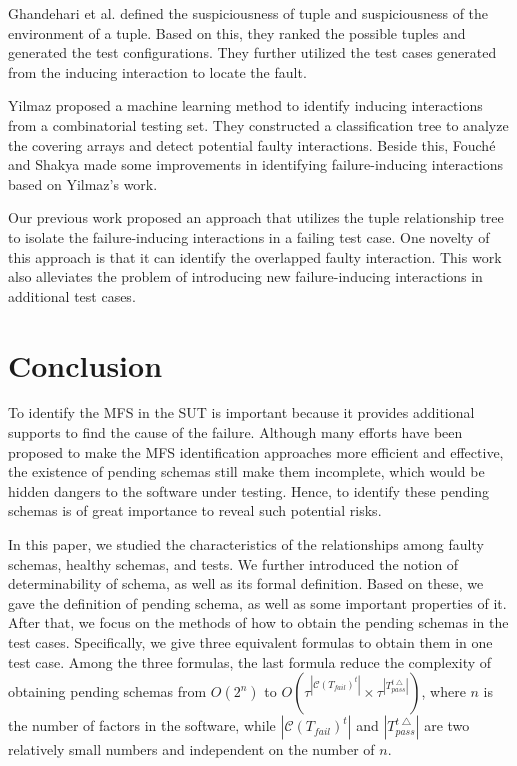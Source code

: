 {Ghandehari et al. \cite{ghandehari2012identifying} defined the suspiciousness of tuple and suspiciousness of the environment of a tuple. Based on this, they ranked the possible tuples and generated the test configurations. They \cite{ghandehari2013fault} further utilized the test cases generated from the inducing interaction to locate the fault.

Yilmaz \cite{yilmaz2006covering} proposed a machine learning method to identify inducing interactions from a combinatorial testing set. They constructed a classification tree to analyze the covering arrays and detect potential faulty interactions. Beside this, Fouch{\'e} \cite{fouche2009incremental} and Shakya \cite{shakya2012isolating} made some improvements in identifying failure-inducing interactions based on Yilmaz's work.

Our previous work \cite{niu2013identifying} proposed an approach that utilizes the tuple relationship tree to isolate the failure-inducing interactions in a failing test case. One novelty of this approach is that it can identify the overlapped faulty interaction. This work also alleviates the problem of introducing new failure-inducing interactions in additional test cases.



\section{Conclusion}\label{sec:conclusion}
To identify the MFS in the SUT is important because it provides additional supports to find the cause of the failure. Although many efforts have been proposed to make the MFS identification approaches more efficient and effective, the existence of pending schemas still make them incomplete, which would be hidden dangers to the software under testing. Hence, to identify these pending schemas is of great importance to reveal such potential risks.

In this paper, we studied the characteristics of the relationships among faulty schemas, healthy schemas, and tests. We further introduced the notion of determinability of schema, as well as its formal definition.
Based on these, we gave the definition of pending schema, as well as some important properties of it. After that, we focus on the methods of how to obtain the pending schemas in the test cases. Specifically, we give three equivalent formulas to obtain them in one test case. Among the three formulas, the last formula reduce the complexity of obtaining pending schemas from $O(2^{n})$ to $O(\tau^{|\mathcal{C}(T_{fail})^{t}|} \times \tau^{|T_{pass}^{t\bigtriangleup}|})$, where $n$ is the number of factors in the software, while $|\mathcal{C}(T_{fail})^{t}|$ and $|T_{pass}^{t\bigtriangleup}|$ are two relatively small numbers and independent on the number of $n$.

}
